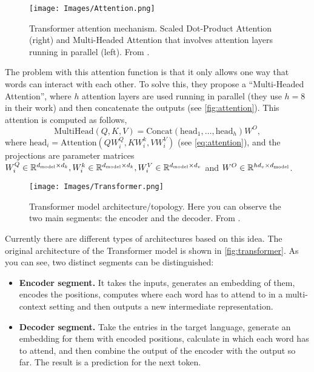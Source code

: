 \begin{figure}[ht]
  \centering
  \texttt{[image: Images/Attention.png]}
  \caption[Transformer attention mechanism]{Transformer attention
    mechanism. Scaled Dot-Product Attention (right) and Multi-Headed Attention
    that involves attention layers running in parallel (left). From
    .}\label{fig:attention}
\end{figure}

The problem with this attention function is that it only allows one way that
words can interact with each other. To solve this, they propose a
``Multi-Headed Attention'', where \(h\) attention layers are used running in
parallel (they use \(h = 8\) in their work) and then concatenate the outputs
(see \vref{fig:attention}). This attention is computed as follows,
\begin{equation}
  \text{MultiHead}(Q, K, V) =
  \text{Concat}(\text{head}_1, \ldots, \text{head}_h)W^O,
\end{equation}
where \(\text{head}_i = \text{Attention}(QW_i^Q, KW_i^k, VW_i^V)\) (see
\vref{eq:attention}), and the projections are parameter matrices
\(W_i^Q \in \mathbb{R}^{d_{\text{model}} \times d_k}, W_i^k \in \mathbb{R}^{d_{\text{model}}
  \times d_k}, W_i^V \in \mathbb{R}^{d_{\text{model}} \times d_v}\) and
\(W^O \in \mathbb{R}^{hd_v \times d_{\text{model}}}\).


\begin{figure}[p]
  \centering
  \texttt{[image: Images/Transformer.png]}
  \caption[Transformer model architecture]{Transformer model
    architecture/topology. Here you can observe the two main segments: the
    encoder and the decoder. From
    .}\label{fig:transformer}
\end{figure}

Currently there are different types of architectures based on this idea. The
original architecture of the Transformer model is shown in
\vref{fig:transformer}. As you can see, two distinct segments can be
distinguished:
\begin{itemize}
  \item \textbf{Encoder segment.} It takes the inputs, generates an embedding
  of them, encodes the positions, computes where each word has to attend to in
  a multi-context setting and then outputs a new intermediate representation.
  \item \textbf{Decoder segment.} Take the entries in the target language,
  generate an embedding for them with encoded positions, calculate in which
  each word has to attend, and then combine the output of the encoder with the
  output so far. The result is a prediction for the next token.
\end{itemize}

